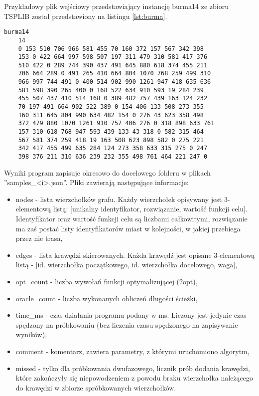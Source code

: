 Przykładowy plik wejściowy przedstawiający instancję burma14 ze zbioru TSPLIB został przedstawiony na listingu
\ref{lst:burma}.

\begin{lstlisting}[caption={Instancja burma14 w formacie akceptowanym przez program}, label=lst:burma]
    burma14
    14
    0 153 510 706 966 581 455 70 160 372 157 567 342 398 
    153 0 422 664 997 598 507 197 311 479 310 581 417 376 
    510 422 0 289 744 390 437 491 645 880 618 374 455 211 
    706 664 289 0 491 265 410 664 804 1070 768 259 499 310 
    966 997 744 491 0 400 514 902 990 1261 947 418 635 636 
    581 598 390 265 400 0 168 522 634 910 593 19 284 239 
    455 507 437 410 514 168 0 389 482 757 439 163 124 232 
    70 197 491 664 902 522 389 0 154 406 133 508 273 355 
    160 311 645 804 990 634 482 154 0 276 43 623 358 498 
    372 479 880 1070 1261 910 757 406 276 0 318 898 633 761 
    157 310 618 768 947 593 439 133 43 318 0 582 315 464 
    567 581 374 259 418 19 163 508 623 898 582 0 275 221 
    342 417 455 499 635 284 124 273 358 633 315 275 0 247 
    398 376 211 310 636 239 232 355 498 761 464 221 247 0     
\end{lstlisting}

Wyniki program zapisuje okresowo do docelowego folderu w plikach ''samples\_<i>.json''.
Pliki zawierają następujące informacje:

\begin{itemize}
    \item nodes - lista wierzchołków grafu. Każdy wierzchołek opisywany jest 3-elementową listą:
          [unikalny identyfikator, rozwiązanie, wartość funkcji celu]. Identyfikator oraz wartość funkcji celu
          są liczbami całkowitymi, rozwiązanie ma zaś postać listy identyfikatorów miast w kolejności, w jakiej przebiega przez nie trasa,
    \item edges - lista krawędzi skierowanych. Każda krawędź jest opisane 3-elementową listą - [id. wierzchołka początkowego, id. wierzchołka docelowego, waga],
    \item opt\_count - liczba wywołań funkcji optymalizującej (2opt),
    \item oracle\_count - liczba wykonanych obliczeń długości ścieżki,
    \item time\_ms - czas działania programu podany w ms. Liczony jest jedynie czas spędzony na próbkowaniu
          (bez liczenia czasu spędzonego na zapisywanie wyników),
    \item comment - komentarz, zawiera parametry, z którymi uruchomiono algorytm,
    \item missed - tylko dla próbkowania dwufazowego, licznik prób dodania krawędzi, które zakończyły się
          niepowodzeniem z powodu braku wierzchołka należącego do krawędzi w zbiorze spróbkowanych wierzchołków.
\end{itemize}

